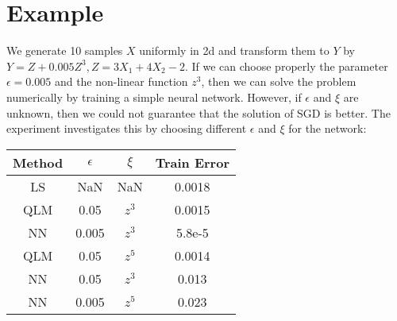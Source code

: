 \documentclass{article}
\begin{document}
\section{Example}
We generate 10 samples $X$ uniformly in 2d and transform them to $Y$ by $Y=Z + 0.005 Z^3, Z = 3X_1 + 4X_2 -2$.
If we can choose properly the parameter $\epsilon = 0.005$ and the non-linear function $z^3$, then we can solve the problem numerically by
training a simple neural network. However, if $\epsilon$ and $\xi$ are unknown, then we could not guarantee that the solution of SGD is better.
The experiment investigates this by choosing different $\epsilon$ and $\xi$ for the network:
\begin{table}[!ht]
	\centering
	\begin{tabular}{cccc}
	 \hline
	 Method & $\epsilon$ & $\xi$ & Train Error \\
	 \hline
	 LS & NaN & NaN & 0.0018 \\
	 QLM & 0.05 & $z^3$ & 0.0015 \\
	 NN & 0.005 & $z^3$ & 5.8e-5\\
	 QLM & 0.05 & $z^5$ & 0.0014 \\
	 NN & 0.05 & $z^3$ & 0.013 \\
	 NN & 0.005 & $z^5$ & 0.023 \\
	 \hline
	\end{tabular}
\end{table}


\end{document}
